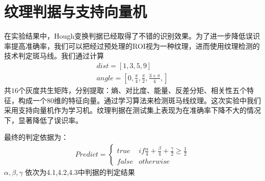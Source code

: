 \section{纹理判据与支持向量机}
在实验结果中，Hough变换判据已经取得了不错的识别效果。为了进一步降低误识率提高准确率，我们可以把经过预处理的ROI视为一种纹理，进而使用纹理检测的技术判定斑马线。我们通过计算
\begin{align}
    dist=[1, 3, 5, 9] \\
    angle=[0, \frac{\pi}{4}, \frac{\pi}{2}, \frac{3 \times \pi}{4}, ]
\end{align}
共$16$个灰度共生矩阵，分别提取：熵、对比度、能量、反差分矩、相关性五个特征，构成一个$80$维的特征向量。通过学习算法来检测斑马线纹理。这次实验中我们采用支持向量机作为学习机。纹理判据在测试集上表现为在准确率下降不大的情况下，显著降低了误识率。\par
最终的判定依据为：
\begin{align}
    Predict=\left\{\begin{matrix}
        true & if \frac{\alpha}{4} + \frac{\beta}{4} + \frac{\gamma}{2} \geq \frac{1}{2} \\
        false & otherwise
        \end{matrix}\right.
\end{align}
$\alpha,\beta,\gamma$ 依次为4.1,4.2,4.3中判据的判定结果 